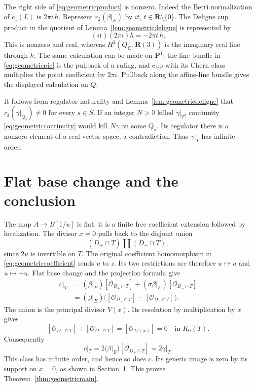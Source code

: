 \documentclass[11pt,a4paper]{article}
\theoremstyle{remark}
\newcommand{\R}{\mathbf R}
\newcommand{\C}{\mathbf C}
\newcommand{\PP}{\mathbf P}
\newcommand{\OO}{\mathcal O}
\begin{document}
The right side of \eqref{eq:geometricproduct} is nonzero.
Indeed the Betti normalization of \(c_1(L)\) is \(2\pi i\,h\).
Represent \(r_2(\beta|_E)\) by \(it\), \(t\in\R\setminus\{0\}\).
The Deligne cup product in the quotient of
Lemma~\ref{lem:geometricdeligne} is represented by
\[
 (it)(2\pi i)h=-2\pi t\,h.
\]
This is nonzero and real, whereas \(H^2(Q_{\C},\R(3))\)
is the imaginary real line through \(h\).
The same calculation can be made on \(\PP^1\): the line bundle
in \eqref{eq:geometricpic} is the pullback of a ruling, and
cup with its Chern class multiplies the point coefficient by
\(2\pi i\). Pullback along the affine-line bundle gives the
displayed calculation on \(Q\).

It follows from regulator naturality and
Lemma~\ref{lem:geometricdeligne} that
\(r_3(\gamma|_{Q_s})\ne0\) for every \(s\in S\).
If an integer \(N>0\) killed \(\gamma|_T\), continuity
\eqref{eq:geometriccontinuity} would kill \(N\gamma\) on some
\(Q_s\). Its regulator there is a nonzero element of a real
vector space, a contradiction. Thus \(\gamma|_T\) has infinite
order.

\section{Flat base change and the conclusion}

The map \(A\to B[1/u]\) is flat: it is a finite free coefficient
extension followed by localization. The divisor \(x=0\) pulls
back to the disjoint union
\[
 (D_+\cap T)\amalg(D_-\cap T),
\]
since \(2u\) is invertible on \(T\).
The original coefficient homomorphism in
\eqref{eq:geometriccoefficient} sends \(u\) to \(z\).
Its two restrictions are therefore \(u\mapsto u\) and
\(u\mapsto-u\). Flat base change and the projection formula give
\begin{align*}
 c|_T
 &= (\beta|_E)[\OO_{D_+\cap T}]
       +(\sigma\beta|_E)[\OO_{D_-\cap T}]\\
 &= (\beta|_E)\bigl([\OO_{D_+\cap T}]
                         -[\OO_{D_-\cap T}]\bigr).
\end{align*}
The union is the principal divisor \(V(x)\).
Its resolution by multiplication by \(x\) gives
\[
 [\OO_{D_+\cap T}]+[\OO_{D_-\cap T}]
   =[\OO_{T/(x)}]=0\quad\text{in }K_0(T).
\]
Consequently
\begin{equation}\label{eq:geometricbasechange}
 c|_T=2(\beta|_E)[\OO_{D_+\cap T}]=2\gamma|_T.
\end{equation}
This class has infinite order, and hence so does \(c\).
Its generic image is zero by its support on \(x=0\), as shown
in Section~1. This proves Theorem~\ref{thm:geometricmain}.
\end{document}
